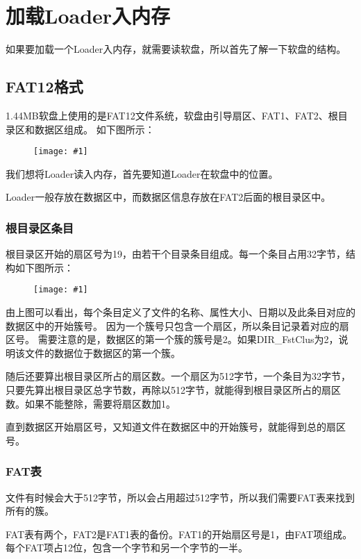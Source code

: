 \documentclass[a4paper,left=2.5cm,right=2.5cm,11pt]{article}
\newcommand{\fic}[1]{\begin{figure}[H]
		\center
		\texttt{[image: \#1]}
	\end{figure}}
\begin{document}
\tableofcontents

\clearpage

\section{加载Loader入内存}
	如果要加载一个Loader入内存，就需要读软盘，所以首先了解一下软盘的结构。

\subsection{FAT12格式}
	1.44MB软盘上使用的是FAT12文件系统，软盘由引导扇区、FAT1、FAT2、根目录区和数据区组成。
	如下图所示：
	\fic{3.png}

	我们想将Loader读入内存，首先要知道Loader在软盘中的位置。\par

	Loader一般存放在数据区中，而数据区信息存放在FAT2后面的根目录区中。\par

\subsubsection{根目录区条目}
	根目录区开始的扇区号为19，由若干个目录条目组成。每一个条目占用32字节，结构如下图所示：
	\fic{4.png}

	由上图可以看出，每个条目定义了文件的名称、属性大小、日期以及此条目对应的数据区中的开始簇号。
	因为一个簇号只包含一个扇区，所以条目记录着对应的扇区号。
	需要注意的是，数据区的第一个簇的簇号是2。如果DIR\_FstClus为2，说明该文件的数据位于数据区的第一个簇。\par

	随后还要算出根目录区所占的扇区数。一个扇区为512字节，一个条目为32字节，
	只要先算出根目录区总字节数，再除以512字节，就能得到根目录区所占的扇区数。如果不能整除，需要将扇区数加1。\par

	直到数据区开始扇区号，又知道文件在数据区中的开始簇号，就能得到总的扇区号。

\subsubsection{FAT表}
	文件有时候会大于512字节，所以会占用超过512字节，所以我们需要FAT表来找到所有的簇。\par

	FAT表有两个，FAT2是FAT1表的备份。FAT1的开始扇区号是1，由FAT项组成。
	每个FAT项占12位，包含一个字节和另一个字节的一半。\par
\end{document}
